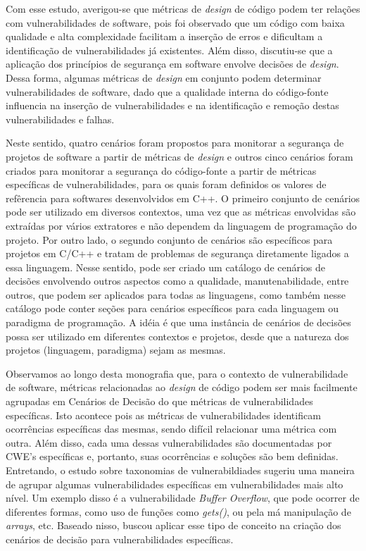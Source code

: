 %

Com esse estudo, averigou-se que métricas de \emph{design} de código podem ter relações com  vulnerabilidades de software, pois foi observado que um código com baixa qualidade e alta complexidade facilitam a inserção de erros e dificultam a identificação de vulnerabilidades já existentes. Além disso, discutiu-se que a aplicação dos princípios de segurança em software envolve decisões de \emph{design}. Dessa forma, algumas métricas de \emph{design} em conjunto podem determinar vulnerabilidades de software, dado que a qualidade interna do código-fonte influencia na inserção de vulnerabilidades e na identificação e remoção destas vulnerabilidades e falhas.

%

Neste sentido, quatro cenários foram propostos para monitorar a segurança de projetos de software a partir de métricas de \emph{design} e outros cinco cenários foram criados para monitorar a segurança do código-fonte a partir de métricas específicas de vulnerabilidades, para os quais foram definidos os valores de refêrencia para softwares desenvolvidos em C++. O primeiro conjunto de cenários pode ser utilizado em diversos contextos, uma vez que as métricas envolvidas são extraídas por vários extratores e não dependem da linguagem de programação do projeto. Por outro lado, o segundo conjunto de cenários são específicos para projetos em C/C++ e tratam de problemas de segurança diretamente ligados a essa linguagem. Nesse sentido, pode ser criado um catálogo de cenários de decisões envolvendo outros aspectos como a qualidade, manutenabilidade, entre outros, que podem ser aplicados para todas as linguagens, como também nesse catálogo pode conter seções para cenários específicos para cada linguagem ou paradigma de programação. A idéia é que uma instância de cenários de decisões possa ser utilizado em diferentes contextos e projetos, desde que a natureza dos projetos (linguagem, paradigma) sejam as mesmas.

%

Observamos ao longo desta monografia que, para o contexto de vulnerabilidade de software, métricas relacionadas ao \emph{design} de código podem ser mais facilmente agrupadas em Cenários de Decisão do que métricas de vulnerabilidades específicas. Isto acontece pois as métricas de vulnerabilidades identificam ocorrências específicas das mesmas, sendo difícil relacionar uma métrica com outra. Além disso, cada uma dessas vulnerabilidades são documentadas por CWE's específicas e, portanto, suas ocorrências e soluções são bem definidas. Entretando, o estudo sobre taxonomias de vulnerabildiades sugeriu uma maneira de agrupar algumas vulnerabilidades específicas em vulnerabilidades mais alto nível. Um exemplo disso é a vulnerabilidade \emph{Buffer Overflow}, que pode ocorrer de diferentes formas, como uso de funções como \emph{gets()}, ou pela má manipulação de \emph{arrays}, etc. Baseado nisso,  buscou aplicar esse tipo de conceito na criação dos cenários de decisão para vulnerabilidades específicas.


